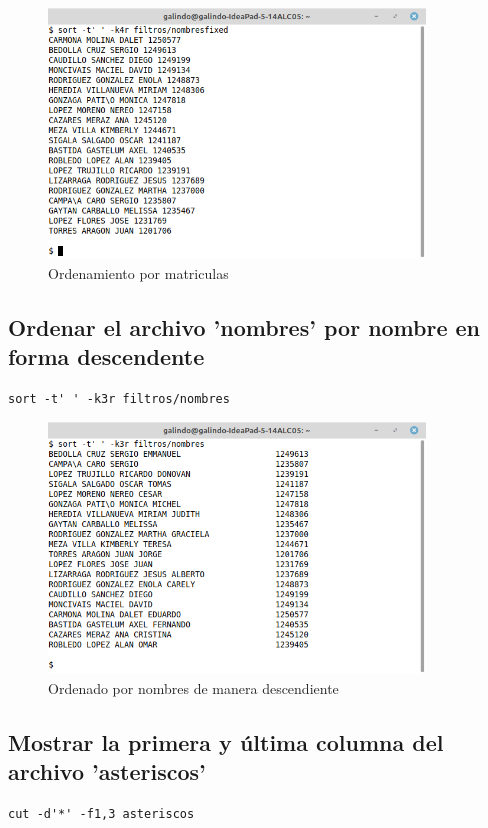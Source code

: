 \documentclass[11pt]{article}
\begin{document}
\begin{figure}[htbp]
\centering
\includegraphics[width=10cm]{img/a13.png}
\caption{Ordenamiento por matriculas}
\end{figure}

\pagebreak

\subsection{Ordenar el archivo 'nombres' por nombre en forma descendente}
\label{sec:org54ad78b}
\begin{verbatim}
sort -t' ' -k3r filtros/nombres
\end{verbatim}

\begin{figure}[htbp]
\centering
\includegraphics[width=10cm]{img/a14.png}
\caption{Ordenado por nombres de manera descendiente}
\end{figure}

\subsection{Mostrar la primera y última columna del archivo 'asteriscos'}
\label{sec:org332f9cf}
\begin{verbatim}
cut -d'*' -f1,3 asteriscos
\end{verbatim}
\end{document}
